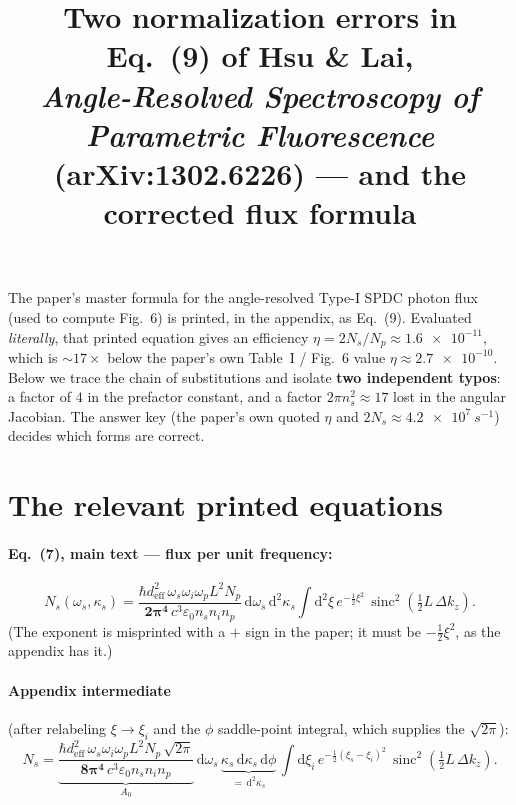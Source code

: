 \documentclass[11pt]{article}
\title{Two normalization errors in Eq.~(9) of Hsu \& Lai,\\
\emph{Angle-Resolved Spectroscopy of Parametric Fluorescence}\\
\large (arXiv:1302.6226) --- and the corrected flux formula}
\author{}
\date{}
\newcommand{\sinc}{\operatorname{sinc}}
\newcommand{\dd}{\mathrm{d}}
\begin{document}
\maketitle

\noindent
The paper's master formula for the angle-resolved Type-I SPDC photon flux
(used to compute Fig.~6) is printed, in the appendix, as Eq.~(9). Evaluated
\emph{literally}, that printed equation gives an efficiency
$\eta = 2N_s/N_p \approx \num{1.6e-11}$, which is $\sim 17\times$ below the
paper's own Table~I / Fig.~6 value $\eta \approx \num{2.7e-10}$.
Below we trace the chain of substitutions and isolate \textbf{two independent
typos}: a factor of $4$ in the prefactor constant, and a factor
$2\pi n_s^2 \approx 17$ lost in the angular Jacobian.
The answer key (the paper's own quoted $\eta$ and $2N_s\approx\SI{4.2e7}{s^{-1}}$)
decides which forms are correct.

\section*{The relevant printed equations}

\paragraph{Eq.~(7), main text --- flux per unit frequency:}
\begin{equation}
N_s(\omega_s,\kappa_s) =
\frac{\hbar d_{\mathrm{eff}}^2\,\omega_s\omega_i\omega_p L^2 N_p}
{\mathbf{2\pi^4}\, c^3\varepsilon_0 n_s n_i n_p}\,
\dd\omega_s\,\dd^2\kappa_s
\int \dd^2\xi\,
e^{-\frac12\xi^2}\,
\sinc^2\!\left(\tfrac12 L\,\Delta k_z\right).
\tag{7}
\end{equation}
(The exponent is misprinted with a $+$ sign in the paper; it must be
$-\tfrac12\xi^2$, as the appendix has it.)

\paragraph{Appendix intermediate} (after relabeling $\xi\to\xi_i$ and the
$\phi$ saddle-point integral, which supplies the $\sqrt{2\pi}$):
\begin{equation}
N_s =
\underbrace{\frac{\hbar d_{\mathrm{eff}}^2\,\omega_s\omega_i\omega_p L^2 N_p\,\sqrt{2\pi}}
{\mathbf{8\pi^4}\, c^3\varepsilon_0 n_s n_i n_p}}_{\textstyle A_0}\,
\dd\omega_s\,\underbrace{\kappa_s\,\dd\kappa_s\,\dd\phi}_{=\,\dd^2\kappa_s}\,
\int \dd\xi_i\, e^{-\frac12(\xi_s-\xi_i)^2}\,
\sinc^2\!\left(\tfrac12 L\,\Delta k_z\right).
\label{eq:inter}
\end{equation}
\end{document}
